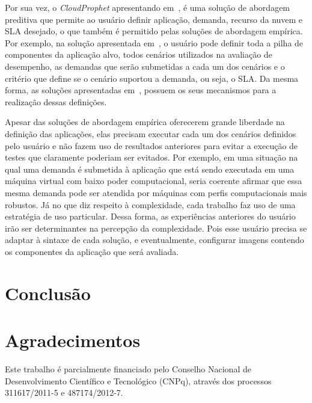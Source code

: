 \documentclass[12pt]{article}
\begin{document}
Por sua vez, o \textit{CloudProphet} apresentando em~\cite{li2011cloudprophet},
é uma solução de abordagem preditiva que permite ao usuário definir aplicação,
demanda, recurso da nuvem e SLA desejado, o que também é permitido pelas
soluções de abordagem empírica. Por exemplo, na solução apresentada
em~\cite{cunhacloud}, o usuário pode definir toda a pilha de componentes
da aplicação alvo, todos cenários utilizados na avaliação de desempenho, as
demandas que serão submetidas a cada um dos cenários e o critério que define se
o cenário suportou a demanda, ou seja, o SLA. Da mesma forma, as soluções
apresentadas em~\cite{jayasinghe2012,silva2013cloudbench,scheuner2014cloud},
possuem os seus mecanismos para a realização dessas definições.

Apesar das soluções de abordagem empírica oferecerem grande liberdade na
definição das aplicações, elas precisam executar cada um dos cenários definidos
pelo usuário e não fazem uso de resultados anteriores para evitar a
execução de testes que claramente poderiam ser evitados. Por exemplo, em uma
situação na qual uma demanda é submetida à aplicação que está sendo executada em
uma máquina virtual com baixo poder computacional, seria coerente afirmar que
essa mesma demanda pode ser atendida por máquinas com perfis computacionais mais
robustos. Já no que diz respeito à complexidade, cada trabalho faz uso de uma
estratégia de uso particular. Dessa forma, as experiências anteriores do usuário
irão ser determinantes na percepção da complexidade. Pois esse usuário precisa
se adaptar à sintaxe de cada solução, e eventualmente, configurar imagens
contendo os componentes da aplicação que será avaliada.

\section{Conclusão}\label{sec:conclusion}


\section*{Agradecimentos}
Este trabalho é parcialmente financiado pelo Conselho Nacional de Desenvolvimento Científico e Tecnológico (CNPq), através dos processos 311617/2011-5 e 487174/2012-7.



\end{document}
